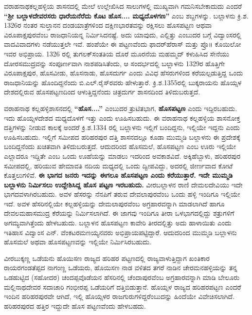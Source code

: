 ವರಾಹನಾಥಕಲ್ಲಹಳ್ಳಿಯ ಶಾಸನದಲ್ಲಿ ಮೇಲೆ ಉಲ್ಲೇಖಿಸಿದ ಸಾಲುಗಳಲ್ಲಿ ಮುಖ್ಯವಾಗಿ ಗಮನಿಸಬೇಕಾದುದು ಎಂದರೆ \textbf{“ಶ‍್ರೀ ಬಲ್ಲಾಳದೇವರಸರು ಧಾರೆಯನೆರೆದು ಕೊಟ} \textbf{ಹೊಸ.... ಮಧ್ಯದೊಳಗಣ” }ಎಂಬ ಶಬ್ದಗಳನ್ನು. ಬಲ್ಲಾಳನು ಕ್ರಿ.ಶ. 1326ರ ನಂತರ ಸುಲ್ತಾನನ ದಂಡಯಾತ್ರೆಗಳಿಂದ ದಕ್ಷಿಣಭಾರತವನ್ನು ರಕ್ಷಿಸಲು ಹೊಸಪಟ್ಟಣ ಆಥವಾ ವಿರೂಪಾಕ್ಷಪುರ\-ವೆಂಬ ರಾಜಧಾನಿಯನ್ನ ನಿರ್ಮಿಸಿದನಷ್ಟೆ. ಅದು ಯಾವುದು, ಎಲ್ಲಿತ್ತು ಎಂಬುದರ ಬಗ್ಗೆ ವಿದ್ವಾಂಸರಲ್ಲಿ ವಾದವಿವಾದಗಳು ನಡೆಯುತ್ತಲೇ ಇವೆ. ಹಂಪೆಯೇ ಈ ಪಟ್ಟಣವೆಂದು ಫಾದರ್​ಹೆರಾಸ್​ ಮತ್ತು ಪ್ರೊ॥ ಕೊಯಿಲೋ ಇವರ ಅಭಿಪ್ರಾಯ. 1326 ರಲ್ಲಿ ತುಗಲಕ್​ ಸಂತತಿಯ ದೊರೆ ಮೂರನೆಯ ಮಹಮ್ಮದ್​ ಕಳುಹಿಸಿದ ಸೇನೆಯು ದೋರಸಮುದ್ರವನ್ನು ಸಂಪೂರ್ಣವಾಗಿ ನಾಶಪಡಿಸಿತೆಂದು, ಆ ಸಂದರ್ಭದಲ್ಲಿ ಬಲ್ಲಾಳನು 1329ರ ಹೊತ್ತಿಗೇ ವಿರೂಪಾಕ್ಷಪುರ, ಹೊಸವೀಡು, ಹೊಸನಾಡು, ಹೊಸದುರ್ಗ ಎಂದು ವಿವಿಧ ಹೆಸರುಗಳಿಂದ ಕರೆಯಲ್ಪಡುತ್ತಿದ್ದ ಒಂದು ರಾಜಧಾನಿಯನ್ನು ಹೊಂದಿದ್ದನೆಂದು ಬಿ.ಎಲ್​.ರೈಸ್​\-ರವರು ಹೇಳುತ್ತಾರೆ. ಕ್ರಿ.ಶ.1355ರಲ್ಲಿ ಬುಕ್ಕರಾಯನು ಹೊಯ್ಸಳ ದೇಶದಲ್ಲಿರುವ ಹೊಸಪಟ್ಟಣದಿಂದ ಆಳುತ್ತಿದ್ದನೆಂದು ಚಿತ್ರದುರ್ಗ ಶಾಸನದಿಂದ ತಿಳಿದುಬರುತ್ತದೆ.

ವರಾಹನಾಥ ಕಲ್ಲಹಳ್ಳಿಶಾಸನದಲ್ಲಿ \textbf{“ಹೊಸ....”} ಎಂಬುದರ ತ್ರುಟಿತಭಾಗ, \textbf{ಹೊಸಪಟ್ಟಣ} ಎಂದು ಇದ್ದಿರಬಹುದು. ಇದು ಹೊಯ್ಸಳದೇಶದ ಮಧ್ಯದೊಳಗೆ ಇತ್ತು ಎಂದು ಊಹಿಸಬಹುದು. ಈ ವರಾಹನಾಥ ಕಲ್ಲಹಳ್ಳಿಯ ಶಾಸನೋಕ್ತ ದತ್ತಿಗಳನ್ನು ನೀಡುವ ಕಾಲಕ್ಕೆ ಅಂದರೆ ಕ್ರಿ.ಶ.1334 ರಲ್ಲಿ ಬಲ್ಲಾಳನು ಇಲ್ಲಿಗೆ ಬಂದಿದ್ದನು, ಇಲ್ಲಿಯೇ ಇದ್ದನು ಎಂದು ಊಹಿಸಬಹುದು. ಇಲ್ಲಿಗೆ ಸಮೀಪದ ಹರಿಹರಪುರ ದತ್ತಿ ಶಾಸನದಲ್ಲೂ ಕೂಡಾ ಮುಮ್ಮಡಿ ಬಲ್ಲಾಳನು ಈ ಪ್ರದೇಶಕ್ಕೆ ಬಂದಿದ್ದನೆಂದು ಖಚಿತವಾಗಿ ತಿಳಿದುಬರುತ್ತದೆ. ಆದುದರಿಂದ ಹೊಸಮಲೆ, ಹೊಸಪಟ್ಟಣ ಎಂಬ ಊರು ಇಲ್ಲಿಯೇ ಎಲ್ಲಾದರೂ ಇದ್ದಿತೇ ಎಂಬ ಒಂದು ಊಹೆಯನ್ನು ಮಾಡಲು ಇದರಿಂದ ಅವಕಾಶವಿದೆ. ಅಕ್ಕಿಹೆಬ್ಬಾಳು, ಹರಿಹರಪುರ ಸಮೀಪದಲ್ಲಿ, ಹರಿಯುವ ಹೇಮಾವತಿ ನದಿಯ ಮಧ್ಯದಲ್ಲಿ ಒಂದು ದ್ವೀಪವಿದ್ದು, ಅದರಲ್ಲಿ ಜೀರ್ಣವಾದ ಕೋಟೆ ಕೊತ್ತಲುಗಳಿವೆ. \textbf{ಈ ಭಾಗದ ಜನರು ಇದನ್ನು ಈಗಲೂ ಹೊಸಪಟ್ಟಣ ಎಂದು ಕರೆಯುತ್ತಾರೆ. ಇದೇ ಮುಮ್ಮಡಿ ಬಲ್ಲಾಳನು ನಿರ್ಮಿಸಲು ಉದ್ದೇಶಿಸಿದ್ದ ಹೊಸ ಪಟ್ಟಣ ಇರಬಹುದು.} ವೀರಬಲ್ಲಾಳನ ರಾಣಿ ದೇಮಲದೇವಿಯು ಇದೇ ಭಾಗದವಳಾಗಿರಬಹುದು. ಅವಳ ಹೆಸರನ್ನು ನೆನಪಿಗೆ ತರುವ ದೇವಲಾಪುರವೆಂಬ ಒಂದು ಹಳ್ಳಿ ಇಂದಿಗೂ ಇಲ್ಲಿಯೇ ಇದೆ. ಅವಳ ಹೆಸರಿನಲ್ಲಿಯೇ ಕಲ್ಲಹಳ್ಳಿಯನ್ನು ದೇಮಲಾಪುರವೆಂಬ ಅಗ್ರಹಾರವನ್ನಾಗಿ ಮಾಡಲಾಗಿದೆ ಹಾಗೂ ದೇವಲಮಹಾಸಮುದ್ರ ಕೆರೆಯನ್ನು ನಿರ್ಮಿಸಲಾಗಿದೆ. ಈ ಜಾಗವು ಇಂದಿಗೂ ತೀರಾ ಒಳಭಾಗದಲ್ಲಿದ್ದು ಶತ್ರುಗಳಿಗೆ ಅಗಮ್ಯವಾಗಿತ್ತೆಂದು ಹೇಳಬಹುದು. ಬಲ್ಲಾಳನ ಹೊಸಪಟ್ಟಣ ಕಾವೇರಿ ತೀರದಲ್ಲಿತ್ತು ಅದು ಹಾಳಾಯಿತು ಎಂದು ಇತಿಹಾಸ ವಿದ್ವಾಂಸ ಎನ್​. ವೆಂಕಟರಮಣಯ್ಯನವರು ಅಭಿಪ್ರಾಯಪಟ್ಟಿದ್ದಾರೆ. ಆದುದರಿಂದ ಮುಮ್ಮಡಿ ಬಲ್ಲಾಳನು ಹೊಸಮಲೆ ಅಥವಾ ಹೊಸಪಟ್ಟಣವನ್ನು ಇಲ್ಲಿಯೇ ನಿರ್ಮಿಸಿರಬಹುದು.

ವೀರಬುಕ್ಕಣ್ಣ ಒಡೆಯನು ಹೊಯಿಸಣ ರಾಜ್ಯದ ಹರಿಹರ ಪಟ್ಟಣದಲ್ಲಿ ರಾಜ್ಯವಾಳುತ್ತಿದ್ದಾಗ ಖಂತಿಕಾರ ರಾಯರಗಂಡ\break ತೆಪ್ಪದ ನಾಗಂಣ್ಣ ಒಡೆಯರು, ಹೊಯಿಸಣ ನಾಡ ವಳಿತದ ತಗರೆ ನಾಡಿನ ಚೇರಮನಹಳ್ಳಿಯನ್ನು ತನ್ನ ಒಡಹುಟ್ಟಿದ (ಸಹೋದರ) ಚಂದಪ್ಪವೊಡೆಯನ ಹೆಸರಿನಲ್ಲಿ ಚೆಂದಾಪುರವೆಂಬ ಅಗ್ರಹಾರವನ್ನಾಗಿ ಮಾಡಿ ಬೇಲೂರು ಮಲ್ಲಿನಾಥದೇವರ ಸದಾಚಾರಿ ಗಂಭೀರಪ್ಪ ಒಡೆಯರಿಗೆ ದತ್ತಿಬಿಡುತ್ತಾನೆ. ಹೊಯ್ಸಳ ರಾಜ್ಯದ ಹರಿಹರಪಟ್ಟಣ ಎಂದರೆ ಇಂದಿನ ಹರಿಹರಪುರವೇ ಆಗಿದೆ, ಇಲ್ಲಿ ಹೊಯ್ಸಳರ ರಾಜಗುರುಗಳಿದ್ದರೆಂಬುದನ್ನು ಹಿಂದೆಯೇ ವಿವೇಚಿಸಲಾಗಿದೆ. ಹರಿಹರಪುರದ ಹತ್ತಿರ ಇದ್ದುದೇ ಹೊಸ ಪಟ್ಟಣವೆಂದು ಹೇಳಬಹದು.

